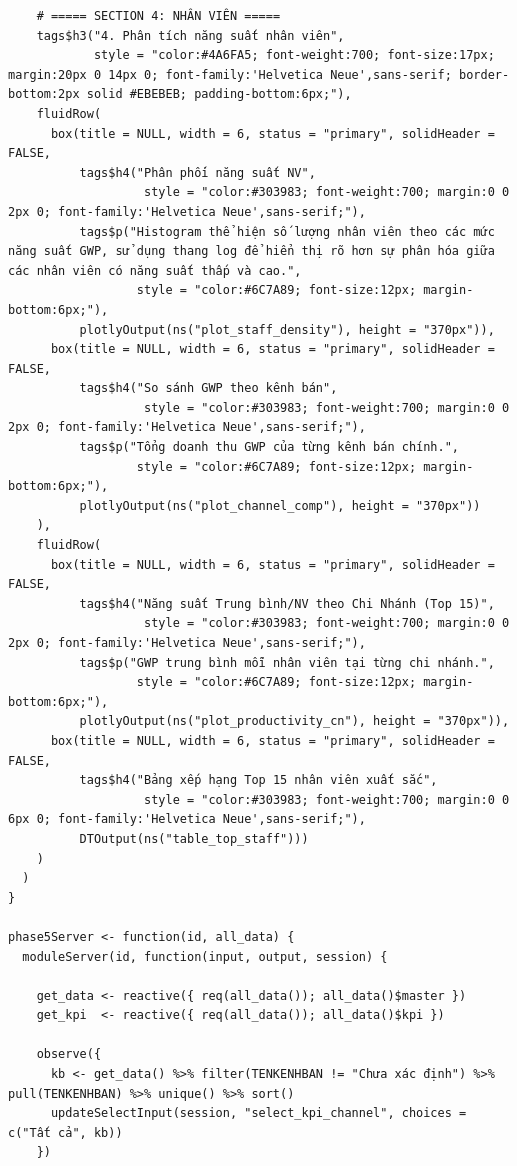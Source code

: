 \documentclass[12pt, a4paper]{article}
\begin{document}
\begin{lstlisting}
    # ===== SECTION 4: NHÂN VIÊN =====
    tags$h3("4. Phân tích năng suất nhân viên",
            style = "color:#4A6FA5; font-weight:700; font-size:17px; margin:20px 0 14px 0; font-family:'Helvetica Neue',sans-serif; border-bottom:2px solid #EBEBEB; padding-bottom:6px;"),
    fluidRow(
      box(title = NULL, width = 6, status = "primary", solidHeader = FALSE,
          tags$h4("Phân phối năng suất NV",
                   style = "color:#303983; font-weight:700; margin:0 0 2px 0; font-family:'Helvetica Neue',sans-serif;"),
          tags$p("Histogram thể hiện số lượng nhân viên theo các mức năng suất GWP, sử dụng thang log để hiển thị rõ hơn sự phân hóa giữa các nhân viên có năng suất thấp và cao.",
                  style = "color:#6C7A89; font-size:12px; margin-bottom:6px;"),
          plotlyOutput(ns("plot_staff_density"), height = "370px")),
      box(title = NULL, width = 6, status = "primary", solidHeader = FALSE,
          tags$h4("So sánh GWP theo kênh bán",
                   style = "color:#303983; font-weight:700; margin:0 0 2px 0; font-family:'Helvetica Neue',sans-serif;"),
          tags$p("Tổng doanh thu GWP của từng kênh bán chính.",
                  style = "color:#6C7A89; font-size:12px; margin-bottom:6px;"),
          plotlyOutput(ns("plot_channel_comp"), height = "370px"))
    ),
    fluidRow(
      box(title = NULL, width = 6, status = "primary", solidHeader = FALSE,
          tags$h4("Năng suất Trung bình/NV theo Chi Nhánh (Top 15)",
                   style = "color:#303983; font-weight:700; margin:0 0 2px 0; font-family:'Helvetica Neue',sans-serif;"),
          tags$p("GWP trung bình mỗi nhân viên tại từng chi nhánh.",
                  style = "color:#6C7A89; font-size:12px; margin-bottom:6px;"),
          plotlyOutput(ns("plot_productivity_cn"), height = "370px")),
      box(title = NULL, width = 6, status = "primary", solidHeader = FALSE,
          tags$h4("Bảng xếp hạng Top 15 nhân viên xuất sắc",
                   style = "color:#303983; font-weight:700; margin:0 0 6px 0; font-family:'Helvetica Neue',sans-serif;"),
          DTOutput(ns("table_top_staff")))
    )
  )
}

phase5Server <- function(id, all_data) {
  moduleServer(id, function(input, output, session) {

    get_data <- reactive({ req(all_data()); all_data()$master })
    get_kpi  <- reactive({ req(all_data()); all_data()$kpi })

    observe({
      kb <- get_data() %>% filter(TENKENHBAN != "Chưa xác định") %>% pull(TENKENHBAN) %>% unique() %>% sort()
      updateSelectInput(session, "select_kpi_channel", choices = c("Tất cả", kb))
    })


\end{lstlisting}
\end{document}

